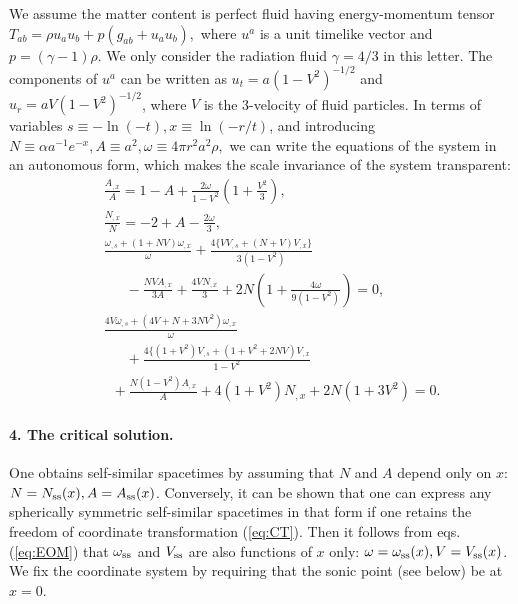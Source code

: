 We assume the matter content is perfect fluid having
energy-momentum tensor
$
        T_{ab}=\rho u_au_b+p(g_{ab}+u_au_b),
$
where $u^a$ is a unit timelike vector and $p=(\gamma-1)\rho$.
We only consider the radiation fluid $\gamma=4/3$ in this letter.
The components of $u^a$ can be written as
$u_t=a (1-V^2)^{-1/2}$ and $u_r=aV (1-V^2)^{-1/2}$,
where $V$ is the 3-velocity of fluid particles.
In terms of variables $s \equiv -\ln(-t), x \equiv \ln (- r/t)$,
and introducing
$        N \equiv \alpha a^{-1} e^{-x},
        A \equiv a^2,
        \omega \equiv 4 \pi r^2 a^2 \rho ,
$
we can write the
equations of the system in an autonomous form, which makes the scale
invariance of the system transparent:
\begin{eqnarray}
        & & \frac{A_{,x}}{A} = 1 - A + \frac{2 \omega}{1-V^2}
                \left (1 + \frac{V^2}{3} \right ) , \nonumber \\
        & & \frac{N_{,x}}{N}
                = -2 + A - \frac{2 \omega}{3}, \nonumber \\
        & & \frac{\omega_{,s} + (1 + N V) \omega_{,x}}
                        {\omega} +
                        \frac{4 \{ V V_{,s} + (N + V) V_{,x} \} }
                        {3 ( 1 - V^2) }
                        \nonumber \\
                & & \quad \; \;
                 - \frac{N V A_{,x}}{3A}
                + \frac{4 V N_{,x}}{3} + 2 N
                  \left ( 1 + \frac{4 \omega}{9 ( 1- V^2) } \right )
                        = 0 , \nonumber \\
        & & \frac{4 V \omega_{,s}
               + (4 V + N + 3 N V^2) \omega_{,x}}
                                 {\omega} \label{eq:EOM}
\\
        & & \quad \; \; +
             \frac{4 \{(1 + V^2) V_{,s} + (1 + V^2 + 2 N V) V_{,x} }
                                 {1 - V^2}
                                 \nonumber \\
        & & \; \; + \frac{N (1 - V^2) A_{,x}}{A}
                + 4(1 + V^2) N_{,x}
                + 2 N ( 1 + 3 V^2) = 0. \nonumber
\end{eqnarray}



\paragraph*{4.  The critical solution.}
One obtains self-similar spacetimes by assuming that $N$ and $A$
depend only on $x$: $N=N_{\rm ss}(x), A=A_{\rm ss}(x)$.
Conversely, it can be shown \cite{AHK95b} that one can
express any spherically symmetric self-similar spacetimes in that
form if one retains the freedom of coordinate transformation
(\ref{eq:CT}).
Then it follows from eqs. (\ref{eq:EOM}) that $\omega_{\rm ss}$
and $V_{\rm ss}$ are also
functions of $x$ only: $\omega=\omega_{\rm ss}(x), V=V_{\rm ss}(x)$.
We fix the coordinate system by
requiring that the sonic point (see below) be at $x=0$.


